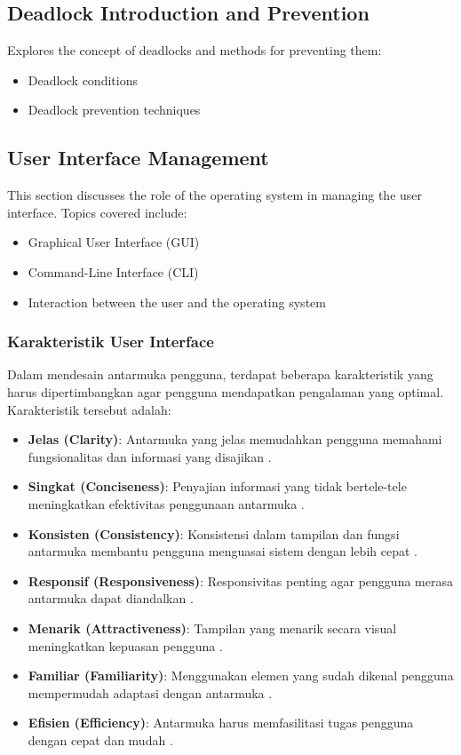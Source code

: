 \documentclass[12pt]{article}
\begin{document}
\subsection{Deadlock Introduction and Prevention}
Explores the concept of deadlocks and methods for preventing them:
\begin{itemize}
    \item Deadlock conditions
    \item Deadlock prevention techniques
\end{itemize}

\subsection{User Interface Management}
This section discusses the role of the operating system in managing the user interface. Topics covered include:
\begin{itemize}
    \item Graphical User Interface (GUI)
    \item Command-Line Interface (CLI)
    \item Interaction between the user and the operating system
\end{itemize}

\subsubsection{Karakteristik User Interface}
Dalam mendesain antarmuka pengguna, terdapat beberapa karakteristik yang harus dipertimbangkan agar pengguna mendapatkan pengalaman yang optimal. Karakteristik tersebut adalah:

\begin{itemize}
    \item \textbf{Jelas (Clarity)}: Antarmuka yang jelas memudahkan pengguna memahami fungsionalitas dan informasi yang disajikan \cite{nielsen1995}.
    \item \textbf{Singkat (Conciseness)}: Penyajian informasi yang tidak bertele-tele meningkatkan efektivitas penggunaan antarmuka \cite{shneiderman1997}.
    \item \textbf{Konsisten (Consistency)}: Konsistensi dalam tampilan dan fungsi antarmuka membantu pengguna menguasai sistem dengan lebih cepat \cite{nielsen2000}.
    \item \textbf{Responsif (Responsiveness)}: Responsivitas penting agar pengguna merasa antarmuka dapat diandalkan \cite{holtzblatt2005}.
    \item \textbf{Menarik (Attractiveness)}: Tampilan yang menarik secara visual meningkatkan kepuasan pengguna \cite{tractinsky1997}.
    \item \textbf{Familiar (Familiarity)}: Menggunakan elemen yang sudah dikenal pengguna mempermudah adaptasi dengan antarmuka \cite{norman1988}.
    \item \textbf{Efisien (Efficiency)}: Antarmuka harus memfasilitasi tugas pengguna dengan cepat dan mudah \cite{nielsen1993}.
\end{itemize}
\end{document}
